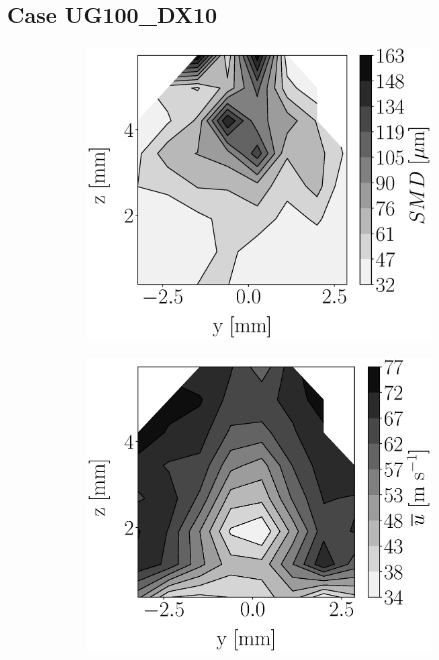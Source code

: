 \clearpage

\subsection*{Case UG100\_DX10}





\begin{figure}[h!]
\flushleft
\begin{subfigure}[b]{0.22\textwidth}
	\centering
   \includegraphics[scale=0.17]{./part2_developments/figures_ch5_resolved_JICF/injectors_SLI/uG100_dx10_x05_SMD_map.eps}
\end{subfigure}
   \hspace{0.17in}
\begin{subfigure}[b]{0.22\textwidth}
	\centering
   \includegraphics[scale=0.17]{./part2_developments/figures_ch5_resolved_JICF/injectors_SLI/uG100_dx10_x05_ux_mean_map.eps}

\end{subfigure}
\end{figure}

